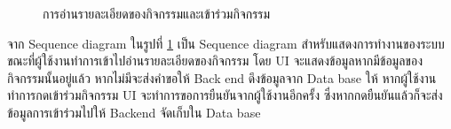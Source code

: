 \documentclass[14pt,oneside,openright,a4paper]{cpe-thai-project}
\begin{document}
  \begin{figure}[!h]\centering
    \setlength{\fboxrule}{0.5mm} %
    \setlength{\fboxsep}{0.5cm}
    \caption{การอ่านรายละเอียดของกิจกรรมและเข้าร่วมกิจกรรม}\label{fig:Select and join event}
  \end{figure}

  จาก Sequence diagram ในรูปที่ \ref{fig:Select and join event} เป็น Sequence diagram สำหรับแสดงการทำงานของระบบขณะที่ผู้ใช้งานทำการเข้าไปอ่านรายละเอียดของกิจกรรม โดย UI จะแสดงข้อมูลหากมีข้อมูลของกิจกรรมนั้นอยู่แล้ว หากไม่มีจะส่งคำขอให้ Back end ดึงข้อมูลจาก Data base ให้ หากผู้ใช้งานทำการกดเข้าร่วมกิจกรรม UI จะทำการขอการยืนยันจากผู้ใช้งานอีกครั้ง ซึ่งหากกดยืนยันแล้วก็จะส่งข้อมูลการเข้าร่วมไปให้ Backend จัดเก็บใน Data base 

\newpage
\end{document}
